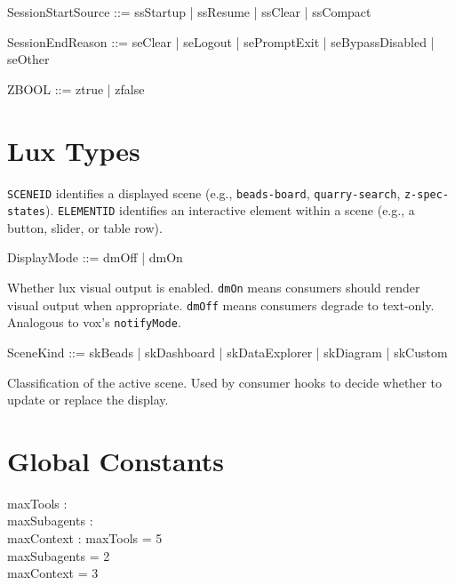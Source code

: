 \documentclass[a4paper,10pt,fleqn]{article}
\begin{document}
\begin{zed}
  SessionStartSource ::= ssStartup | ssResume | ssClear | ssCompact
\end{zed}

\begin{zed}
  SessionEndReason ::= seClear | seLogout | sePromptExit | seBypassDisabled | seOther
\end{zed}

\begin{zed}
  ZBOOL ::= ztrue | zfalse
\end{zed}

\section{Lux Types}

\begin{zed}
\end{zed}

\texttt{SCENEID} identifies a displayed scene (e.g.,
\texttt{beads-board}, \texttt{quarry-search}, \texttt{z-spec-states}).
\texttt{ELEMENTID} identifies an interactive element within a scene
(e.g., a button, slider, or table row).

\begin{zed}
  DisplayMode ::= dmOff | dmOn
\end{zed}

Whether lux visual output is enabled. \texttt{dmOn} means consumers
should render visual output when appropriate. \texttt{dmOff} means
consumers degrade to text-only. Analogous to vox's
\texttt{notifyMode}.

\begin{zed}
  SceneKind ::= skBeads | skDashboard | skDataExplorer | skDiagram | skCustom
\end{zed}

Classification of the active scene. Used by consumer hooks to decide
whether to update or replace the display.

\section{Global Constants}

\begin{axdef}
  maxTools : \nat \\
  maxSubagents : \nat \\
  maxContext : \nat
  \where
  maxTools = 5 \\
  maxSubagents = 2 \\
  maxContext = 3
\end{axdef}
\end{document}
